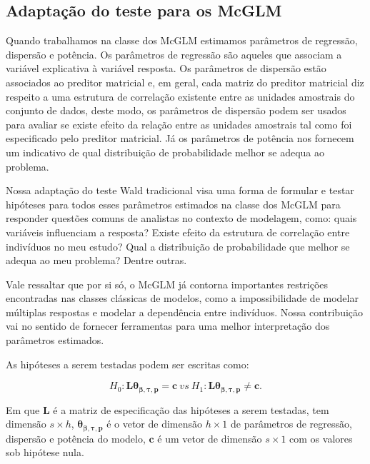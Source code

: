 \subsection{Adaptação do teste para os McGLM}

Quando trabalhamos na classe dos McGLM estimamos parâmetros de regressão, dispersão e potência. Os parâmetros de regressão são aqueles que associam a variável explicativa à variável resposta. Os parâmetros de dispersão estão associados ao preditor matricial e, em geral, cada matriz do preditor matricial diz respeito a uma estrutura de correlação existente entre as unidades amostrais do conjunto de dados, deste modo, os parâmetros de dispersão podem ser usados para avaliar se existe efeito da relação entre as unidades amostrais tal como foi especificado pelo preditor matricial. Já os parâmetros de potência nos fornecem um indicativo de qual distribuição de probabilidade melhor se adequa ao problema. 

Nossa adaptação do teste Wald tradicional visa uma forma de formular e testar hipóteses para todos esses parâmetros estimados na classe dos McGLM para responder questões comuns de analistas no contexto de modelagem, como: quais variáveis influenciam a resposta? Existe efeito da estrutura de correlação entre indivíduos no meu estudo? Qual a distribuição de probabilidade que melhor se adequa ao meu problema? Dentre outras.

Vale ressaltar que por si só, o McGLM já contorna importantes restrições encontradas nas classes clássicas de modelos, como a impossibilidade de modelar múltiplas respostas e modelar a dependência entre indivíduos. Nossa contribuição vai no sentido de fornecer ferramentas para uma melhor interpretação dos parâmetros estimados.

As hipóteses a serem testadas podem ser escritas como:

\begin{equation}
H_0: \boldsymbol{L}\boldsymbol{\theta_{\beta,\tau,p}} = \boldsymbol{c} \ vs \ H_1: \boldsymbol{L}\boldsymbol{\theta_{\beta,\tau,p}} \neq \boldsymbol{c}. 
\end{equation}

\noindent Em que $\boldsymbol{L}$ é a matriz de especificação das hipóteses a serem testadas, tem dimensão $s \times h$, $\boldsymbol{\theta_{\beta,\tau,p}}$ é o vetor de dimensão $h \times 1$ de parâmetros de regressão, dispersão e potência do modelo, $\boldsymbol{c}$ é um vetor de dimensão $s \times 1$ com os valores sob hipótese nula.

